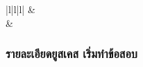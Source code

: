 \begin{table}[H]
\begin{tabular}{|l|l|l|}
  \hline
                       & \\[-\rowheight]
  \printcelltop                                     & \\
  \hline
  \end{tabular}
  \caption{รายละเอียดยูสเคส รายละเอียดข้อสอบ}
  \label{Table:examDetails}
\end{table}

\subsubsection{รายละเอียดยูสเคส เริ่มทำข้อสอบ}

